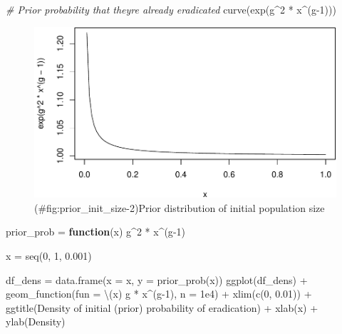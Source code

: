 \documentclass[
]{book}
\newenvironment{Shaded}{\begin{snugshade}}{\end{snugshade}}
\newcommand{\AttributeTok}[1]{\textcolor[rgb]{0.77,0.63,0.00}{#1}}
\newcommand{\CommentTok}[1]{\textcolor[rgb]{0.56,0.35,0.01}{\textit{#1}}}
\newcommand{\ControlFlowTok}[1]{\textcolor[rgb]{0.13,0.29,0.53}{\textbf{#1}}}
\newcommand{\DecValTok}[1]{\textcolor[rgb]{0.00,0.00,0.81}{#1}}
\newcommand{\FloatTok}[1]{\textcolor[rgb]{0.00,0.00,0.81}{#1}}
\newcommand{\FunctionTok}[1]{\textcolor[rgb]{0.00,0.00,0.00}{#1}}
\newcommand{\NormalTok}[1]{#1}
\newcommand{\OtherTok}[1]{\textcolor[rgb]{0.56,0.35,0.01}{#1}}
\newcommand{\SpecialCharTok}[1]{\textcolor[rgb]{0.00,0.00,0.00}{#1}}
\newcommand{\StringTok}[1]{\textcolor[rgb]{0.31,0.60,0.02}{#1}}
\begin{document}
\begin{Shaded}
\begin{Highlighting}[]
\CommentTok{\# Prior probability that they\textquotesingle{}re already eradicated}
\FunctionTok{curve}\NormalTok{(}\FunctionTok{exp}\NormalTok{(g}\SpecialCharTok{\^{}}\DecValTok{2} \SpecialCharTok{*}\NormalTok{ x}\SpecialCharTok{\^{}}\NormalTok{(g}\DecValTok{{-}1}\NormalTok{)))}
\end{Highlighting}
\end{Shaded}

\begin{figure}
\centering
\includegraphics{_main_files/figure-latex/prior_init_size-2.pdf}
\caption{(\#fig:prior\_init\_size-2)Prior distribution of initial population size}
\end{figure}

\begin{Shaded}
\begin{Highlighting}[]
\NormalTok{prior\_prob }\OtherTok{=} \ControlFlowTok{function}\NormalTok{(x) g}\SpecialCharTok{\^{}}\DecValTok{2} \SpecialCharTok{*}\NormalTok{ x}\SpecialCharTok{\^{}}\NormalTok{(g}\DecValTok{{-}1}\NormalTok{)}

\NormalTok{x }\OtherTok{=} \FunctionTok{seq}\NormalTok{(}\DecValTok{0}\NormalTok{, }\DecValTok{1}\NormalTok{, }\FloatTok{0.001}\NormalTok{)}

\NormalTok{df\_dens }\OtherTok{=} \FunctionTok{data.frame}\NormalTok{(}\AttributeTok{x =}\NormalTok{ x, }\AttributeTok{y =} \FunctionTok{prior\_prob}\NormalTok{(x))}
\FunctionTok{ggplot}\NormalTok{(df\_dens) }\SpecialCharTok{+}
  \FunctionTok{geom\_function}\NormalTok{(}\AttributeTok{fun =}\NormalTok{ \textbackslash{}(x) g }\SpecialCharTok{*}\NormalTok{ x}\SpecialCharTok{\^{}}\NormalTok{(g}\DecValTok{{-}1}\NormalTok{), }
                \AttributeTok{n =} \FloatTok{1e4}\NormalTok{) }\SpecialCharTok{+}
  \FunctionTok{xlim}\NormalTok{(}\FunctionTok{c}\NormalTok{(}\DecValTok{0}\NormalTok{, }\FloatTok{0.01}\NormalTok{)) }\SpecialCharTok{+}
  \FunctionTok{ggtitle}\NormalTok{(}\StringTok{\textquotesingle{}Density of initial (prior) probability of eradication\textquotesingle{}}\NormalTok{) }\SpecialCharTok{+}
  \FunctionTok{xlab}\NormalTok{(}\StringTok{\textquotesingle{}x\textquotesingle{}}\NormalTok{) }\SpecialCharTok{+}
  \FunctionTok{ylab}\NormalTok{(}\StringTok{\textquotesingle{}Density\textquotesingle{}}\NormalTok{)}
\end{Highlighting}
\end{Shaded}
\end{document}
